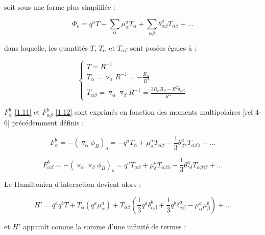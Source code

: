 \documentclass[12pt,a4paper]{book}
\begin{document}
	soit sous une forme plus simplifiée : 
	
	\begin{equation}
	\Phi_{o} = q^{a} T - \sum_{\alpha} \mu_{\alpha}^{a} T_{\alpha} + \sum_{\alpha\beta} \theta_{\alpha\beta}^{a} T_{\alpha\beta} + \ldots
	\end{equation}
	
        \noindent dans laquelle, les quantités $T$, $T_{\alpha}$ et $T_{\alpha\beta}$ sont posées égales à :
	
	\begin{equation}
	\begin{cases}
	T = R^{-1} \\
	T_{\alpha} = \triangledown_{\alpha} R^{-1} = - \frac{R_{\alpha}}{R^{3}}\\
	T_{\alpha\beta} = \triangledown_{\alpha} \triangledown_{\beta} R^{-1} = \frac{3R_{\alpha} R_{\beta}- R^{2}\delta_{\alpha\beta}}{R^{5}}
	\end{cases}
	\end{equation}
	
	$F_{\alpha}^{b}$ \ref{1.11} et $F_{\alpha\beta}^{b}$ \ref{1.12} sont exprimés en fonction des moments multipolaires [ref 4-6] précédemment définis : 
	
	\begin{equation}
	F_{\alpha}^{b} = -(\triangledown_{\alpha}\phi_{B})_{o} = -q^{a} T_{\alpha} + \mu_{\alpha}^{a} T_{\alpha\beta} - \frac{1}{3} \theta_{\beta\gamma}^{a} T_{\alpha\beta\lambda} + \ldots 
	\end{equation}
	
	\begin{equation}
	F_{\alpha\beta}^{b} = -(\triangledown_{\alpha} \triangledown_{\beta}\phi_{B})_{o} = q^{a} T_{\alpha\beta} + \mu_{\delta}^{a} T_{\alpha\beta\lambda} - \frac{1}{3} \theta_{\gamma\delta}^{a} T_{\alpha\beta\gamma\delta} + \ldots 
	\end{equation}
	
	Le Hamiltonien d'interaction devient alors : 
	
	\begin{equation}
	H' = q^{a} q^{b} T + T_{\alpha}(q^{a} \mu_{\alpha}^{a}) + T_{\alpha\beta} (\frac{1}{3}q^{a}\delta^{b}_{\alpha\beta}+ \frac{1}{3} q^{b}\delta^{a}_{\alpha\beta} - \mu_{\alpha}^{a}\mu_{\beta}^{b}) + \ldots  \label{1.19}
	\end{equation}
	
	\noindent et $H'$ apparaît comme la somme d'une infinité de termes : 
	
\end{document}
